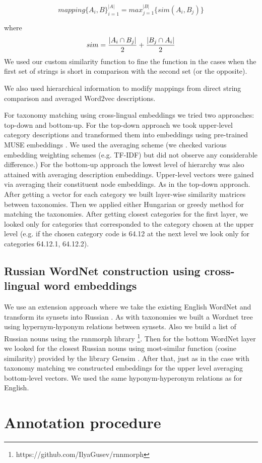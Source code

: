 \documentclass[11pt,a4paper]{article}
\begin{document}
$$mapping\{A_i, B\}_{i=1}^{|A|} = max_{j=1}^{|B|}\{sim(A_i,B_j)\}$$

where $$sim = \dfrac{|A_i \cap B_j|}{2} + \\ \dfrac{|B_j \cap A_i|}{2} $$
We used our custom similarity function to fine the function in the cases when the first set of strings is short in comparison with the second set (or the opposite).

We also used hierarchical information to modify mappings from direct string comparison and averaged Word2vec descriptions.  

For taxonomy matching using cross-lingual embeddings we tried two approaches: top-down and bottom-up. For the top-down approach we took upper-level category descriptions and transformed them into embeddings using pre-trained MUSE embeddings \cite{muse}. We used the averaging scheme (we checked various embedding weighting schemes (e.g. TF-IDF) but did not observe any considerable difference.)
For the bottom-up approach the lowest level of hierarchy was also attained with averaging description embeddings. Upper-level vectors were gained via averaging their constituent node embeddings. As in the top-down approach.
After getting a vector for each category we built layer-wise similarity matrices between taxonomies. Then we applied either Hungarian or greedy method for matching the taxonomies. After getting closest categories for the first layer, we looked only for categories that corresponded to the category chosen at the upper level (e.g. if the chosen category code is 64.12 at the next level we look only for categories 64.12.1, 64.12.2).
\subsection{Russian WordNet construction using cross-lingual word embeddings}
We use an extension approach where we take the existing English WordNet and transform its synsets into Russian \cite{NEALE18.1030}. As with taxonomies we built a Wordnet tree using hypernym-hyponym relations between synsets. Also we build a list of Russian nouns using the rnnmorph library \footnote{https://github.com/IlyaGusev/rnnmorph}. Then for the bottom WordNet layer we looked for the closest Russian nouns using most-similar function (cosine similarity) provided by the library Gensim \cite{gensim}. After that, just as in the case with taxonomy matching we constructed embeddings for the upper level averaging bottom-level vectors. We used the same hyponym-hyperonym relations as for English.
\section{Annotation procedure}
\end{document}
